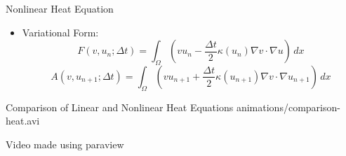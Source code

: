 \documentclass[serif]{beamer}
\begin{document}
\begin{frame}{Nonlinear Heat Equation}
    \begin{itemize}
				
				\vspace{-3em}
        \item Variational Form:
					\[
						F(v, u_n; \Delta t) = \int_\Omega \left(v u_n - \frac{\Delta t}{2} \kappa(u_n) \nabla v \cdot \nabla u\right) \, dx
					\] 
					\[
						A(v, u_{n+1}; \Delta t) = \int_\Omega \left(v u_{n+1} + \frac{\Delta t}{2} \kappa(u_{n+1}) \nabla v \cdot \nabla u_{n+1}\right) \, dx
					\] 
				\end{itemize}
\end{frame}

\begin{frame}{Comparison of Linear and Nonlinear Heat Equations}
	\centering
	{animations/comparison-heat.avi}

	Video made using paraview
\end{frame}
\end{document}
